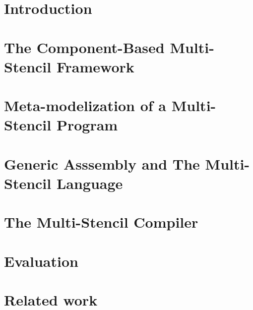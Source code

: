 \documentclass[smallextended]{svjour3}       %
\begin{document}
\section{Introduction}
\label{sect:introduction}

\section{The Component-Based Multi-Stencil Framework}
\label{sect:msf}

\section{Meta-modelization of a Multi-Stencil Program}
\label{sect:formalism}

\section{Generic Asssembly and The Multi-Stencil Language}
\label{sect:msl}

\section{The Multi-Stencil Compiler}
\label{sect:parallelism}

%
%
\section{Evaluation}
\label{sect:eval}

\section{Related work}
\label{sect:rel}

\end{document}
